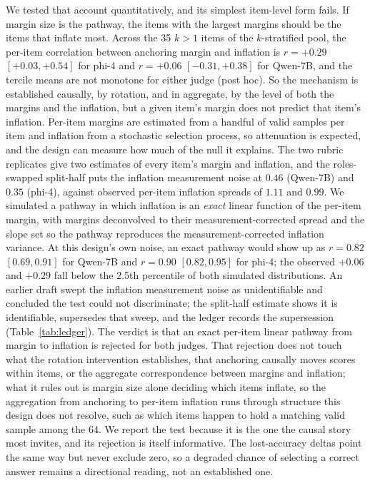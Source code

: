 \documentclass[11pt]{article}
\begin{document}
We tested that account quantitatively, and its simplest item-level form fails.
If margin size is the pathway, the items with the largest margins should be the items that inflate most.
Across the 35 $k{>}1$ items of the $k$-stratified pool, the per-item correlation between anchoring margin and inflation is $r{=}+0.29$ $[+0.03, +0.54]$ for phi-4 and $r{=}+0.06$ $[-0.31, +0.38]$ for Qwen-7B, and the tercile means are not monotone for either judge (post hoc).
So the mechanism is established causally, by rotation, and in aggregate, by the level of both the margins and the inflation, but a given item's margin does not predict that item's inflation.
Per-item margins are estimated from a handful of valid samples per item and inflation from a stochastic selection process, so attenuation is expected, and the design can measure how much of the null it explains.
The two rubric replicates give two estimates of every item's margin and inflation, and the roles-swapped split-half puts the inflation measurement noise at $0.46$ (Qwen-7B) and $0.35$ (phi-4), against observed per-item inflation spreads of $1.11$ and $0.99$.
We simulated a pathway in which inflation is an \emph{exact} linear function of the per-item margin, with margins deconvolved to their measurement-corrected spread and the slope set so the pathway reproduces the measurement-corrected inflation variance.
At this design's own noise, an exact pathway would show up as $r = 0.82$ $[0.69, 0.91]$ for Qwen-7B and $r = 0.90$ $[0.82, 0.95]$ for phi-4; the observed $+0.06$ and $+0.29$ fall below the 2.5th percentile of both simulated distributions.
An earlier draft swept the inflation measurement noise as unidentifiable and concluded the test could not discriminate; the split-half estimate shows it is identifiable, supersedes that sweep, and the ledger records the supersession (Table~\ref{tab:ledger}).
The verdict is that an exact per-item linear pathway from margin to inflation is rejected for both judges.
That rejection does not touch what the rotation intervention establishes, that anchoring causally moves scores within items, or the aggregate correspondence between margins and inflation; what it rules out is margin size alone deciding which items inflate, so the aggregation from anchoring to per-item inflation runs through structure this design does not resolve, such as which items happen to hold a matching valid sample among the 64.
We report the test because it is the one the causal story most invites, and its rejection is itself informative.
The lost-accuracy deltas point the same way but never exclude zero, so a degraded chance of selecting a correct answer remains a directional reading, not an established one.
\end{document}
